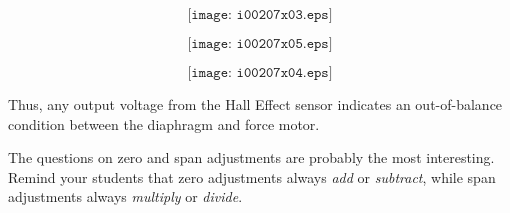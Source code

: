 $$\texttt{[image: i00207x03.eps]}$$

$$\texttt{[image: i00207x05.eps]}$$

$$\texttt{[image: i00207x04.eps]}$$

Thus, any output voltage from the Hall Effect sensor indicates an out-of-balance condition between the diaphragm and force motor.







The questions on zero and span adjustments are probably the most interesting.  Remind your students that zero adjustments always {\it add} or {\it subtract}, while span adjustments always {\it multiply} or {\it divide}.




